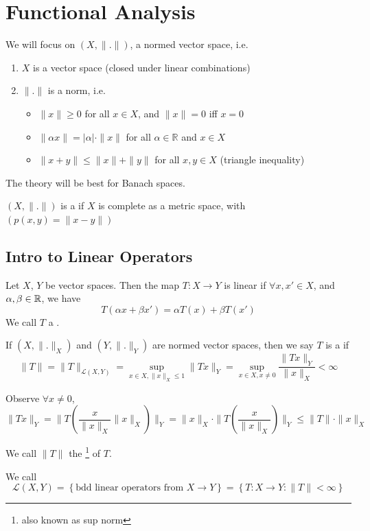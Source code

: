 \section{Functional Analysis}


We will focus on $(X, \| . \| )$, a normed vector space, i.e.
\begin{enumerate}
    \item $X$ is a vector space (closed under linear combinations)
    \item $\| . \| $ is a norm, i.e.
    \begin{itemize}
        \item $\| x \| \geq 0$ for all $x \in X$, and $\| x \| = 0$ iff $x = 0$
        \item $\| \alpha x \| = |\alpha| \cdot \| x \|$ for all $\alpha \in \mathbb{R}$ and $x \in X$
        \item $\| x + y \| \leq \| x \| + \| y \|$ for all $x, y \in X$ (triangle inequality) 
    \end{itemize}
\end{enumerate}

The theory will be best for Banach spaces.

\begin{defn}
    $(X, \| . \| )$ is a  if $X$ is complete as a metric space,
    with $(p(x, y) = \| x - y \| )$  
\end{defn}


\subsection{Intro to Linear Operators}

\begin{defn}
    Let $X$, $Y$ be vector spaces. Then the map $T : X \to Y$ is linear if $\forall x, x' \in X$,
    and $\alpha, \beta \in \mathbb{R}$, we have
    \[
        T(\alpha x + \beta x') = \alpha T(x) + \beta T(x')
    \]      
    We call $T$ a .

    If $(X, \| . \|_X )$ and $(Y, \| . \|_Y )$ are normed vector spaces, then we say 
    $T$ is a  if
    \[
       \| T \| = \| T \|_{\mathcal{L}(X, Y)} = \sup_{x \in X, \| x \|_X \leq 1} \| Tx \|_Y
       = \sup_{x \in X, x \neq 0} \frac{\| Tx \|_Y}{\| x \|_X} < \infty
    \] 

    Observe $\forall x \neq 0$, 
    \[
        \| Tx \|_Y = \| T(\frac{x}{\| x \|_X } \| x \|_X ) \|_Y = 
        \| x \|_X \cdot \| T(\frac{x}{\| x \|_X }) \|_Y  \leq \| T \| \cdot \| x \|_X  
    \]  

    We call $\| T \|$ the \footnote{also known as sup norm} of $T$.
    
    We call \[\mathcal{L}(X, Y) = \left\{ \text{bdd linear operators from } X \to Y \right\} =
    \left\{ T : X \to Y : \| T \| < \infty \right\} \]
\end{defn}

